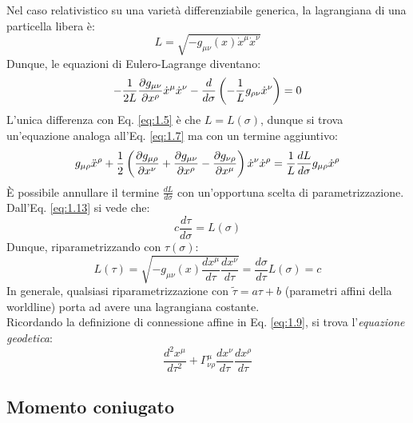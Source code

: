 Nel caso relativistico su una varietà differenziabile generica, la lagrangiana di una particella libera è:
\begin{equation}
  L = \sqrt{ - g_{\mu \nu} (x) \dot{x}^{\mu} \dot{x}^{\nu}}
  \label{eq:1.14}
\end{equation}
Dunque, le equazioni di Eulero-Lagrange diventano:
\begin{equation}
  - \frac{1}{2L} \frac{\partial g_{\mu \nu}}{\partial x^{\rho}} \dot{x}^{\mu} \dot{x}^{\nu} - \frac{d}{d\sigma} \left( - \frac{1}{L} g_{\rho \nu} \dot{x}^{\nu} \right) = 0
  \label{eq:1.15}
\end{equation}
L'unica differenza con Eq. \ref{eq:1.5} è che $ L = L(\sigma) $, dunque si trova un'equazione analoga all'Eq. \ref{eq:1.7} ma con un termine aggiuntivo:
\begin{equation}
  g_{\mu \rho} \ddot{x}^{\rho} + \frac{1}{2} \left( \frac{\partial g_{\mu \rho}}{\partial x^{\nu}} + \frac{\partial g_{\mu \nu}}{\partial x^{\rho}} - \frac{\partial g_{\nu \rho}}{\partial x^{\mu}} \right) \dot{x}^{\nu} \dot{x}^{\rho} = \frac{1}{L} \frac{dL}{d\sigma} g_{\mu \rho} \dot{x}^{\rho}
  \label{eq:1.16}
\end{equation}
È possibile annullare il termine $ \frac{dL}{d\sigma} $ con un'opportuna scelta di parametrizzazione. Dall'Eq. \ref{eq:1.13} si vede che:
\begin{equation}
  c \frac{d\tau}{d\sigma} = L(\sigma)
  \label{eq:1.17}
\end{equation}
Dunque, riparametrizzando con $ \tau(\sigma) $:
\begin{equation}
  L(\tau) = \sqrt{ -g_{\mu \nu}(x) \frac{dx^{\mu}}{d\tau} \frac{dx^{\nu}}{d\tau}} = \frac{d\sigma}{d\tau} L(\sigma) = c
  \label{eq:1.18}
\end{equation}
In generale, qualsiasi riparametrizzazione con $ \tilde{\tau} = a \tau + b $ (parametri affini della worldline) porta ad avere una lagrangiana costante.\\
Ricordando la definizione di connessione affine in Eq. \ref{eq:1.9}, si trova l'\textit{equazione geodetica}:
\begin{equation}
  \frac{d^2 x^{\mu}}{d\tau^2} + \Gamma^{\mu}_{\nu \rho} \frac{dx^{\nu}}{d\tau} \frac{dx^{\rho}}{d\tau}
  \label{eq:1.19}
\end{equation}

\subsection{Momento coniugato}

